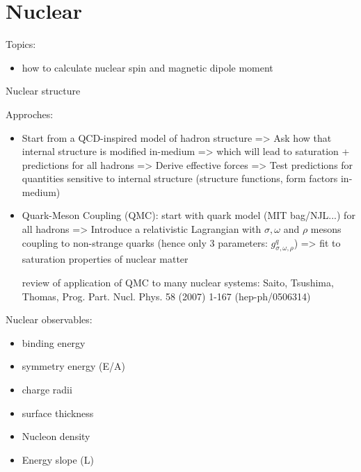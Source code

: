 \chapter{Nuclear}

Topics:
\begin{itemize}
    \item how to calculate nuclear spin and magnetic dipole moment
\end{itemize}

Nuclear structure

Approches:
\begin{itemize}
    \item Start from a QCD-inspired model of hadron structure => Ask how that internal structure is modified in-medium => which will lead to saturation + predictions for all hadrons => Derive effective forces => Test predictions for quantities sensitive to internal structure (structure functions, form factors in-medium)
    \item Quark-Meson Coupling (QMC): start with quark model (MIT bag/NJL...) for all hadrons => Introduce a relativistic Lagrangian with $\sigma, \omega$ and $\rho$ mesons coupling to non-strange quarks (hence only 3 parameters: $g^q_{\sigma, \omega, \rho}$) => fit to saturation properties of nuclear matter

	review of application of QMC to many nuclear systems: Saito, Tsushima, Thomas, Prog. Part. Nucl. Phys. 58 (2007) 1-167 (hep-ph/0506314) 
\end{itemize}

Nuclear observables:
\begin{itemize}
    \item binding energy
    \item symmetry energy (E/A)
    \item charge radii
    \item surface thickness
    \item Nucleon density
    \item Energy slope (L)
\end{itemize}
